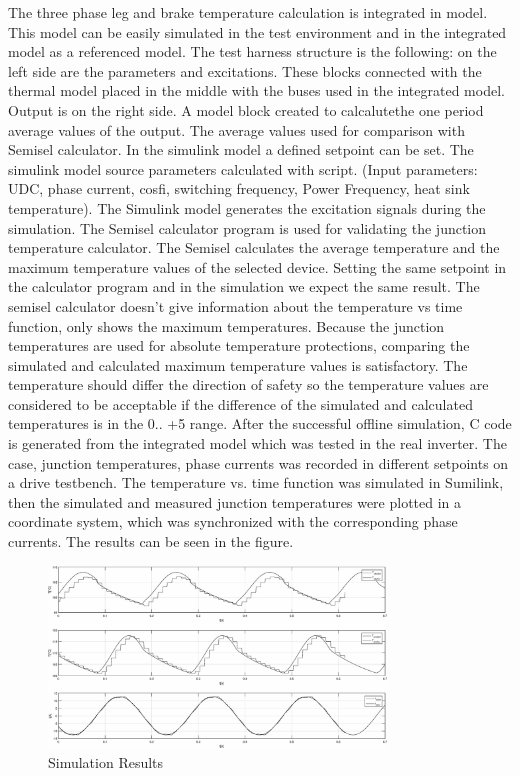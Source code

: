 The three phase leg and brake temperature calculation is integrated in model. This model can be easily simulated in the test environment and in the integrated model as a referenced model.
The test harness structure is the following: on the left side are the parameters and excitations. These blocks connected with the thermal model placed in the middle with the buses used in the integrated model. Output is on the right side. A model block created to calcalutethe one period average values of the output. The average values used for comparison with Semisel calculator. 
In the simulink model a defined setpoint can be set. The simulink model source parameters calculated with  script. (Input parameters: UDC, phase current, cosfi, switching frequency, Power Frequency, heat sink temperature). The Simulink model generates the excitation signals during the simulation.
The Semisel calculator program is used for validating the junction temperature calculator. The Semisel calculates the average temperature and the maximum temperature values of the selected device. Setting the same setpoint in the calculator program and in the simulation we expect the same result. The  semisel calculator doesn’t give information about the temperature vs time function, only shows the maximum temperatures. Because the junction temperatures are used for absolute temperature protections, comparing the simulated and calculated maximum temperature values is satisfactory. The temperature should differ the direction of safety so the temperature values are considered to be acceptable if the difference of the simulated and calculated temperatures is in the 0.. +5 range.
After the successful offline simulation, C code is generated from the integrated model which was tested in the real inverter.
The case, junction temperatures, phase currents was recorded in different setpoints on a drive testbench. The temperature vs. time function was simulated in Sumilink, then the simulated and measured junction temperatures were  plotted in a coordinate system, which was synchronized with the corresponding phase currents. The results can be seen in the figure.

\begin{figure}[!h]
\centering
\includegraphics[width=0.8\textwidth]{figures/homerseklet}
\caption{Simulation Results}
\label{fig_sim}
\end{figure}


